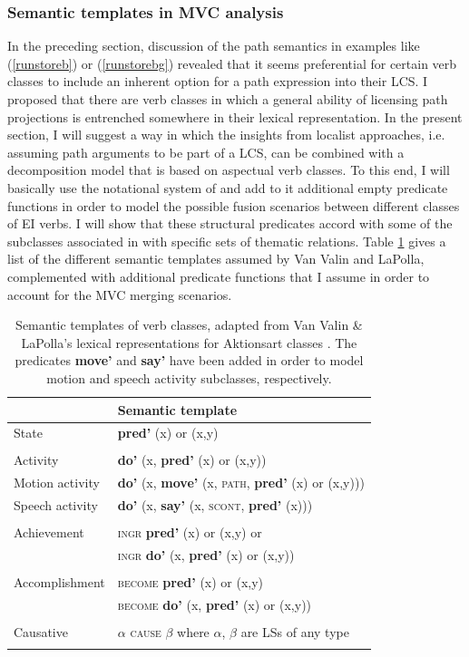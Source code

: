\subsubsection{Semantic templates in MVC analysis} \label{sec:sem-templates}

In the preceding section, discussion of the path semantics in examples like (\ref{runstoreb}) or (\ref{runstorebg}) revealed that it seems preferential for certain verb classes to include an inherent option for a path expression into their LCS. I proposed that there are verb classes in which a general ability of licensing path projections is entrenched somewhere in their lexical representation. In the present section, I will suggest a way in which the insights from localist approaches, i.e. assuming path arguments to be part of a LCS, can be combined with a decomposition model that is based on aspectual verb classes. To this end, I will basically use the notational system of \citet{van1997syntax} and add to it additional empty predicate functions in order to model the possible fusion scenarios between different classes of EI verbs. I will show that these structural predicates accord with some of the subclasses associated in \citet{van1997syntax} with specific sets of thematic relations. Table \ref{table:semtemp} gives a list of the different semantic templates assumed by Van Valin and LaPolla, complemented with additional predicate functions that I assume in order to account for the MVC merging scenarios.

\begin{table}
\begin{tabular}{ll}
\lsptoprule
\multicolumn{1}{l}{Verb class}&\multicolumn{1}{l}{Semantic template}\tabularnewline
\midrule
State&\textbf{pred'} (x) or (x,y)\tabularnewline\tabularnewline
Activity&\textbf{do'} (x, \textbf{pred'} (x) or (x,y))\tabularnewline
Motion activity&\textbf{do'} (x, \textbf{move'} (x, \textsc{path}, \textbf{pred'} (x) or (x,y)))\tabularnewline
Speech activity&\textbf{do'} (x, \textbf{say'} (x, \textsc{scont}, \textbf{pred'} (x)))\tabularnewline\tabularnewline
Achievement&\textsc{ingr} \textbf{pred'} (x) or (x,y) or\tabularnewline
&\textsc{ingr} \textbf{do'} (x, \textbf{pred'} (x) or (x,y))\tabularnewline\tabularnewline
Accomplishment&\textsc{become} \textbf{pred'} (x) or (x,y)\tabularnewline
&\textsc{become} \textbf{do'} (x, \textbf{pred'} (x) or (x,y))\tabularnewline\tabularnewline
Causative&$\alpha$ \textsc{cause} $\beta$ where $\alpha$, $\beta$ are LSs of any type\tabularnewline
\lspbottomrule
\end{tabular}
\caption[Semantic templates of verb classes, adapted from \citet{van1997syntax}]{Semantic templates of verb classes, adapted from Van Valin \& LaPolla's lexical representations for Aktionsart classes \citep[109]{van1997syntax}. The predicates \textbf{move'} and \textbf{say'} have been added in order to model motion and speech activity subclasses, respectively.}
\label{table:semtemp}
\end{table}

